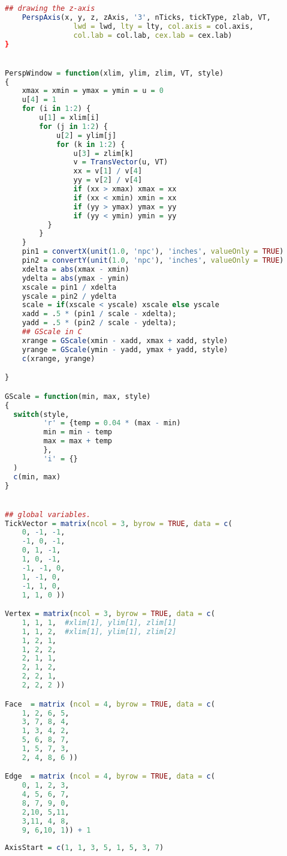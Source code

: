 \begin{lstlisting}[language = R]
    ## drawing the z-axis
    PerspAxis(x, y, z, zAxis, '3', nTicks, tickType, zlab, VT, 
                lwd = lwd, lty = lty, col.axis = col.axis, 
                col.lab = col.lab, cex.lab = cex.lab)
}


PerspWindow = function(xlim, ylim, zlim, VT, style)
{
    xmax = xmin = ymax = ymin = u = 0
    u[4] = 1
    for (i in 1:2) {
        u[1] = xlim[i]
        for (j in 1:2) {
            u[2] = ylim[j]
            for (k in 1:2) {
                u[3] = zlim[k]
                v = TransVector(u, VT)
                xx = v[1] / v[4]
                yy = v[2] / v[4]
                if (xx > xmax) xmax = xx
                if (xx < xmin) xmin = xx
                if (yy > ymax) ymax = yy
                if (yy < ymin) ymin = yy
          }
        }
    }
    pin1 = convertX(unit(1.0, 'npc'), 'inches', valueOnly = TRUE)
    pin2 = convertY(unit(1.0, 'npc'), 'inches', valueOnly = TRUE)
    xdelta = abs(xmax - xmin)
    ydelta = abs(ymax - ymin)
    xscale = pin1 / xdelta
    yscale = pin2 / ydelta
    scale = if(xscale < yscale) xscale else yscale
    xadd = .5 * (pin1 / scale - xdelta);
    yadd = .5 * (pin2 / scale - ydelta);
    ## GScale in C
    xrange = GScale(xmin - xadd, xmax + xadd, style)
    yrange = GScale(ymin - yadd, ymax + yadd, style)
    c(xrange, yrange)

}

GScale = function(min, max, style)
{
  switch(style, 
         'r' = {temp = 0.04 * (max - min)
         min = min - temp
         max = max + temp
         },
         'i' = {}
  )
  c(min, max)
}


## global variables.
TickVector = matrix(ncol = 3, byrow = TRUE, data = c(
    0, -1, -1,
    -1, 0, -1,
    0, 1, -1,
    1, 0, -1,
    -1, -1, 0,
    1, -1, 0,
    -1, 1, 0,
    1, 1, 0 ))

Vertex = matrix(ncol = 3, byrow = TRUE, data = c(
	1, 1, 1,  #xlim[1], ylim[1], zlim[1]
	1, 1, 2,  #xlim[1], ylim[1], zlim[2]
	1, 2, 1,
	1, 2, 2,
	2, 1, 1,
	2, 1, 2,
	2, 2, 1,
	2, 2, 2 ))

Face  = matrix (ncol = 4, byrow = TRUE, data = c(
    1, 2, 6, 5,
    3, 7, 8, 4,
    1, 3, 4, 2,
    5, 6, 8, 7,
    1, 5, 7, 3,
    2, 4, 8, 6 ))

Edge  = matrix (ncol = 4, byrow = TRUE, data = c(
    0, 1, 2, 3,
    4, 5, 6, 7,
    8, 7, 9, 0,
    2,10, 5,11,
    3,11, 4, 8,
    9, 6,10, 1)) + 1
    
AxisStart = c(1, 1, 3, 5, 1, 5, 3, 7)

\end{lstlisting}
\newpage
